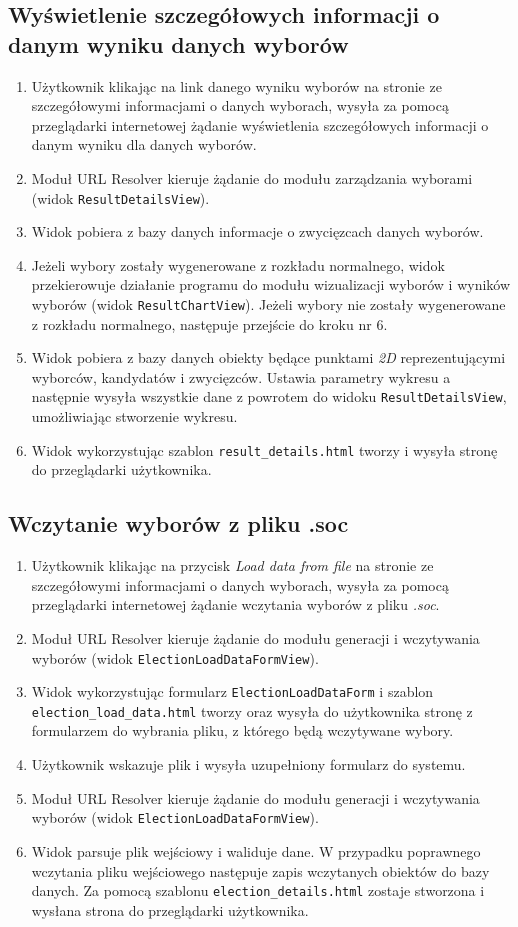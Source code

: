 \documentclass[pdflatex,11pt]{../aghdoc_version2}
\newcommand{\code}[1]{\texttt{#1}}
\begin{document}
\subsection{Wyświetlenie szczegółowych informacji o danym wyniku danych
wyborów}
\begin{enumerate}
\item Użytkownik klikając na link danego wyniku wyborów na stronie ze szczegółowymi
informacjami o danych wyborach, wysyła za pomocą przeglądarki internetowej
żądanie wyświetlenia szczegółowych informacji o danym wyniku dla danych
wyborów.
\item Moduł URL Resolver kieruje żądanie do modułu zarządzania wyborami (widok
\code{ResultDetailsView}).
\item Widok pobiera z bazy danych informacje o zwycięzcach danych wyborów.
\item Jeżeli wybory zostały wygenerowane z rozkładu normalnego, widok przekierowuje
działanie programu do modułu wizualizacji wyborów i wyników wyborów (widok
\code{ResultChartView}). Jeżeli wybory nie zostały wygenerowane z rozkładu normalnego, następuje przejście do kroku nr $6$.
\clearpage
\item Widok pobiera z bazy danych obiekty będące punktami \textit{2D} reprezentującymi
wyborców, kandydatów i zwycięzców. Ustawia parametry wykresu a następnie
wysyła wszystkie dane z powrotem do widoku \code{ResultDetailsView}, umożliwiając
stworzenie wykresu.
\item Widok wykorzystując szablon \code{result\_details.html} tworzy i wysyła stronę do
przeglądarki użytkownika.
\end{enumerate}

\subsection{Wczytanie wyborów z pliku .soc}
\begin{enumerate}
\item Użytkownik klikając na przycisk \textit{Load data from file} na stronie ze szczegółowymi
informacjami o danych wyborach, wysyła za pomocą przeglądarki internetowej
żądanie wczytania wyborów z pliku \textit{.soc}.
\item Moduł URL Resolver kieruje żądanie do modułu generacji i wczytywania wyborów (widok
\code{ElectionLoadDataFormView}).
\item Widok wykorzystując formularz \code{ElectionLoadDataForm} i szablon
\code{election\_load\_data.html} tworzy oraz wysyła do użytkownika stronę z formularzem do
wybrania pliku, z którego będą wczytywane wybory.
\item Użytkownik wskazuje plik i wysyła uzupełniony formularz do systemu.
\item Moduł URL Resolver kieruje żądanie do modułu generacji i wczytywania wyborów (widok
\code{ElectionLoadDataFormView}).
\item Widok parsuje plik wejściowy i waliduje dane. W przypadku poprawnego wczytania
pliku wejściowego następuje zapis wczytanych obiektów do bazy danych. Za pomocą
szablonu \code{election\_details.html} zostaje stworzona i wysłana strona do przeglądarki
użytkownika.
\end{enumerate}
\end{document}
